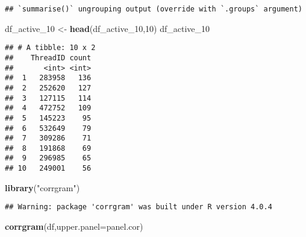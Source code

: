 \documentclass[
]{article}
\newenvironment{Shaded}{\begin{snugshade}}{\end{snugshade}}
\newcommand{\DataTypeTok}[1]{\textcolor[rgb]{0.13,0.29,0.53}{#1}}
\newcommand{\DecValTok}[1]{\textcolor[rgb]{0.00,0.00,0.81}{#1}}
\newcommand{\KeywordTok}[1]{\textcolor[rgb]{0.13,0.29,0.53}{\textbf{#1}}}
\newcommand{\NormalTok}[1]{#1}
\newcommand{\OperatorTok}[1]{\textcolor[rgb]{0.81,0.36,0.00}{\textbf{#1}}}
\newcommand{\StringTok}[1]{\textcolor[rgb]{0.31,0.60,0.02}{#1}}
\begin{document}
\begin{verbatim}
## `summarise()` ungrouping output (override with `.groups` argument)
\end{verbatim}

\begin{Shaded}
\begin{Highlighting}[]
\NormalTok{df_active_}\DecValTok{10}\NormalTok{ <-}\StringTok{ }\KeywordTok{head}\NormalTok{(df_active_}\DecValTok{10}\NormalTok{,}\DecValTok{10}\NormalTok{)}
\NormalTok{df_active_}\DecValTok{10}
\end{Highlighting}
\end{Shaded}

\begin{verbatim}
## # A tibble: 10 x 2
##    ThreadID count
##       <int> <int>
##  1   283958   136
##  2   252620   127
##  3   127115   114
##  4   472752   109
##  5   145223    95
##  6   532649    79
##  7   309286    71
##  8   191868    69
##  9   296985    65
## 10   249001    56
\end{verbatim}

\begin{Shaded}
\end{Shaded}

\begin{Shaded}
\begin{Highlighting}[]
\KeywordTok{library}\NormalTok{(}\StringTok{"corrgram"}\NormalTok{)}
\end{Highlighting}
\end{Shaded}

\begin{verbatim}
## Warning: package 'corrgram' was built under R version 4.0.4
\end{verbatim}

\begin{Shaded}
\begin{Highlighting}[]
\KeywordTok{corrgram}\NormalTok{(df,}\DataTypeTok{upper.panel=}\NormalTok{panel.cor)}
\end{Highlighting}
\end{Shaded}
\end{document}

